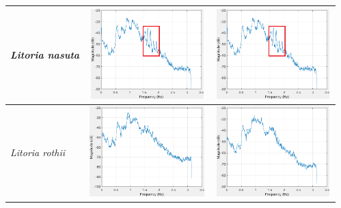 \begin{table}[htb!]
{\begin{tabular}{lll}
\textit{Litoria nasuta}              &   \begin{minipage}{.3\textwidth} \includegraphics[width=45mm, height=35mm]{image/Ch1/5_signal.png}  \end{minipage}                           &                                               \begin{minipage}{.3\textwidth} \includegraphics[width=45mm, height=35mm]{image/Ch1/5_signal.png}  \end{minipage} \\ 
\hline
\textit{Litoria rothii}             &  \begin{minipage}{.3\textwidth} \includegraphics[width=45mm, height=35mm]{image/Ch1/6_signal.png}  \end{minipage}                         &    \begin{minipage}{.3\textwidth} \includegraphics[width=45mm, height=35mm]{image/Ch1/6_noise.png}  \end{minipage}                                           \\ \hline

\end{tabular}}
\end{table}
